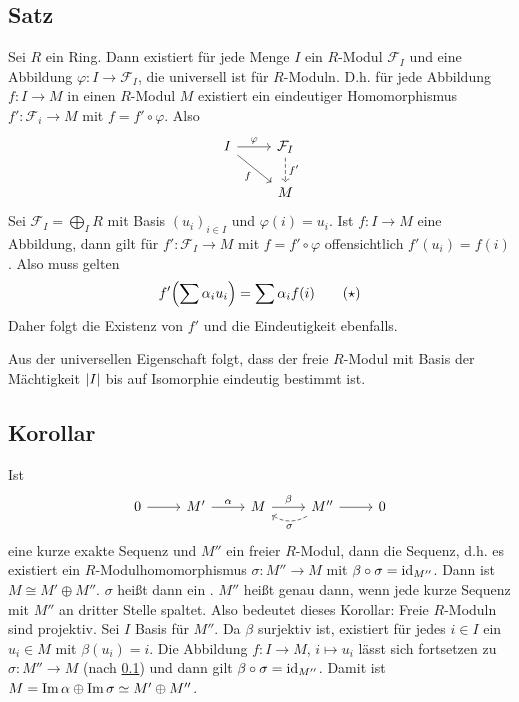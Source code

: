 \subsection[Satz: Universelle Eigenschaft der freien $R$-Moduln]{Satz} %
\label{sub:235}
Sei $R$ ein Ring. Dann existiert für jede Menge $I$ ein $R$-Modul $\mathcal{F}_I $ und eine Abbildung $\varphi : I \to \mathcal{F}_I $, die universell ist für 
$R$-Moduln. D.h. für jede Abbildung $f : I \to M$ in einen $R$-Modul $M$ existiert ein eindeutiger Homomorphismus $f' : \mathcal{F}_i  \to M $ mit $f = f' \circ  \varphi$.
Also
\[
	\begin{tikzcd}
		I \rar{\varphi} \drar[swap]{f}& \mathcal{F}_I \dar[dashed]{f'} \\
		& M 
	\end{tikzcd}
\]
Sei $\mathcal{F}_I = \bigoplus_I R$ mit Basis $(u_i)_{i \in I}$ und $\varphi(i)=u_i$. Ist $f : I \to M$ eine Abbildung, dann gilt für $f' : \mathcal{F}_I \to M$ mit 
$f=  f' \circ \varphi$ offensichtlich $f'(u_i)= f(i)$. Also muss gelten 
\[
	f'\enbrace*{\sum \alpha_i u_i} = \sum \alpha_i f(i) \tag*{($\star$)}
\]
Daher folgt die Existenz von $f'$ und die Eindeutigkeit ebenfalls. \bewende

Aus der universellen Eigenschaft folgt, dass der freie $R$-Modul mit Basis der Mächtigkeit $\lvert I\rvert$ bis auf Isomorphie eindeutig bestimmt ist.

\subsection[Korollar: Freie Moduln sind projektiv]{Korollar} %
\label{sub:236}
Ist 
\[
	\begin{tikzcd}
		0 \rar& M' \rar["\alpha"]& M \rar["\beta"]& M'' \rar \lar["\sigma", bend left, dashed]& 0
	\end{tikzcd}
\]
eine kurze exakte Sequenz und $M''$ ein freier $R$-Modul, dann  die Sequenz, d.h. es 
existiert ein $R$-Modulhomomorphismus $\sigma : M''  \to M$ mit $\beta \circ \sigma = \operatorname{id}_{M''}$. Dann ist $M \cong M' \oplus M''$. $\sigma$ heißt dann ein . 
$M''$ heißt  genau dann, wenn jede kurze Sequenz mit $M''$ an dritter Stelle spaltet. Also bedeutet dieses Korollar: Freie $R$-Moduln sind projektiv. 
Sei $I$ Basis für $M''$. Da $\beta$ surjektiv ist, existiert für jedes $i \in I$ ein $u_i \in M$ mit $\beta(u_i)= i$. Die Abbildung $f : I \to M$, $i \mapsto u_i$ lässt 
sich fortsetzen zu $\sigma : M'' \to M$ (nach \ref{sub:235}) und dann gilt $\beta \circ \sigma = \operatorname{id}_{M''}$. Damit ist 
$M = \operatorname{Im} \alpha \oplus \operatorname{Im} \sigma \simeq M' \oplus M''$. \bewende

